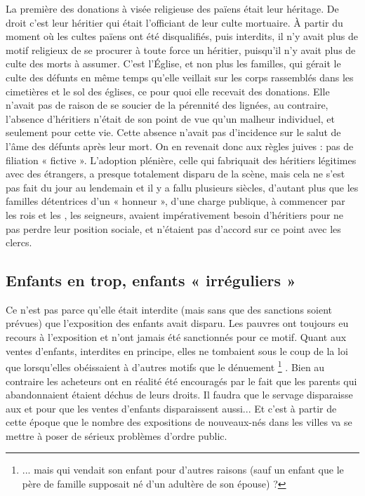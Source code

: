  La première des donations à visée religieuse des païens était leur héritage. De droit c'est leur héritier qui était l'officiant de leur culte mortuaire. À partir du moment où les cultes païens ont été disqualifiés, puis interdits, il n'y avait plus de motif religieux de se procurer à toute force un héritier, puisqu'il n'y avait plus de culte des morts à assumer.  C'est l'Église, et non plus les familles, qui gérait le culte des défunts en même temps qu'elle veillait sur les corps rassemblés dans les cimetières et le sol des églises, ce pour quoi elle recevait des donations. Elle n'avait pas de raison de se soucier de la pérennité des lignées, au contraire, l'absence d'héritiers n'était de son point de vue qu'un malheur individuel, et seulement pour cette vie. Cette absence n'avait pas d'incidence sur le salut de l'âme des défunts après leur mort. On en revenait donc aux règles juives : pas de filiation « fictive ». L'adoption plénière, celle qui fabriquait des héritiers légitimes avec des étrangers, a presque totalement disparu de la scène, mais cela ne s'est pas fait du jour au lendemain et il y a fallu plusieurs siècles, d'autant plus que les familles détentrices d'un « honneur », d'une charge publique, à commencer par les rois et les , les seigneurs, avaient impérativement besoin d'héritiers pour ne pas perdre leur position sociale, et n'étaient pas d'accord sur ce point avec les clercs. 


\subsection{Enfants en trop, enfants « irréguliers »}

 Ce n'est pas parce qu'elle était interdite (mais sans que des sanctions soient prévues) que l'exposition des enfants avait disparu. Les pauvres ont toujours eu recours à l'exposition et n'ont jamais été sanctionnés pour ce motif. Quant aux ventes d'enfants, interdites en principe, elles ne tombaient sous le coup de la loi que lorsqu'elles obéissaient à d'autres motifs que le dénuement%
\footnote{... mais qui vendait son enfant pour d'autres raisons (sauf un enfant que le père de famille supposait né d'un adultère de son épouse) ?}%
. Bien au contraire les acheteurs ont en réalité été encouragés par le fait que les parents qui abandonnaient étaient déchus de leurs droits. Il faudra que le servage disparaisse aux  et  pour que les ventes d'enfants disparaissent aussi... Et c'est à partir de cette époque que le nombre des expositions de nouveaux-nés dans les villes va se mettre à poser de sérieux problèmes d'ordre public.

